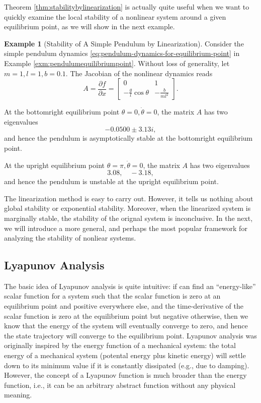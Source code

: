 \documentclass[
]{book}
\theoremstyle{definition}
\theoremstyle{definition}
\newtheorem{example}{Example}[chapter]
\theoremstyle{definition}
\theoremstyle{definition}
\theoremstyle{remark}
\begin{document}
Theorem \ref{thm:stabilitybylinearization} is actually quite useful when we want to quickly examine the local stability of a nonlinear system around a given equilibrium point, as we will show in the next example.

\begin{example}[Stability of A Simple Pendulum by Linearization]
\protect\hypertarget{exm:pendulumstabilitybylinearization}{}\label{exm:pendulumstabilitybylinearization}Consider the simple pendulum dynamics \eqref{eq:pendulum-dynamics-for-equilibrium-point} in Example \ref{exm:pendulumequilibriumpoint}. Without loss of generality, let \(m=1,l=1,b=0.1\). The Jacobian of the nonlinear dynamics reads
\[
A = \frac{\partial f}{\partial x} = 
\begin{bmatrix}
0 & 1 \\
-\frac{g}{l} \cos \theta & -\frac{b}{ml^2}
\end{bmatrix}.
\]

At the bottomright equilibrium point \(\theta =0, \dot{\theta} = 0\), the matrix \(A\) has two eigenvalues
\[
-0.0500 \pm 3.13i,
\]
and hence the pendulum is asymptotically stable at the bottomright equilibrium point.

At the upright equilibrium point \(\theta =\pi, \dot{\theta} = 0\), the matrix \(A\) has two eigenvalues
\[
3.08, \quad -3.18,
\]
and hence the pendulum is unstable at the upright equilibrium point.
\end{example}

The linearization method is easy to carry out. However, it tells us nothing about global stability or exponential stability. Moreover, when the linearized system is marginally stable, the stability of the orignal system is inconclusive. In the next, we will introduce a more general, and perhaps the most popular framework for analyzing the stability of nonliear systems.

\hypertarget{lyapunov-analysis}{%
\subsection{Lyapunov Analysis}\label{lyapunov-analysis}}

The basic idea of Lyapunov analysis is quite intuitive: if can find an ``energy-like'' scalar function for a system such that the scalar function is zero at an equilibrium point and positive everywhere else, and the time-derivative of the scalar function is zero at the equilibrium point but negative otherwise, then we know that the energy of the system will eventually converge to zero, and hence the state trajectory will converge to the equilibrium point. Lyapunov analysis was originally inspired by the energy function of a mechanical system: the total energy of a mechanical system (potental energy plus kinetic energy) will settle down to its minimum value if it is constantly dissipated (e.g., due to damping). However, the concept of a Lyapunov function is much broader than the energy function, i.e., it can be an arbitrary abstract function without any physical meaning.
\end{document}

